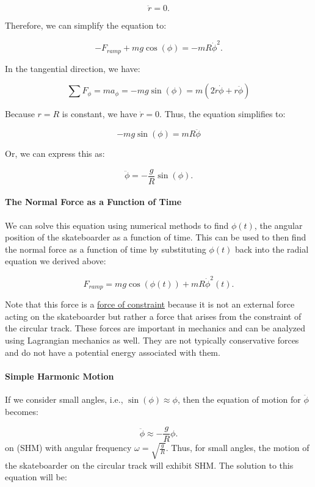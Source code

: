 \documentclass[11pt]{article}
\begin{document}
\[\ddot{r} = 0.\]

Therefore, we can simplify the equation to:

\[-F_{ramp} + mg \cos(\phi) = -mR \dot{\phi}^2.\]

In the tangential direction, we have:

\[\sum F_{\phi} = ma_{\phi} = -mg \sin(\phi) = m\left(2 \dot{r} \dot{\phi} + r \ddot{\phi}\right)\]

Because \(r=R\) is constant, we have \(\dot{r} = 0\). Thus, the equation
simplifies to:

\[-mg \sin(\phi) = mR \ddot{\phi}\]

Or, we can express this as:

\[\ddot{\phi} = -\frac{g}{R} \sin(\phi).\]

\paragraph{The Normal Force as a Function of
Time}\label{the-normal-force-as-a-function-of-time}

We can solve this equation using numerical methods to find \(\phi(t)\),
the angular position of the skateboarder as a function of time. This can
be used to then find the normal force as a function of time by
substituting \(\phi(t)\) back into the radial equation we derived above:

\[F_{ramp} = mg \cos(\phi(t)) + mR \dot{\phi}^2(t).\]

Note that this force is a
\href{https://en.wikipedia.org/wiki/Constraint_force}{force of
constraint} because it is not an external force acting on the
skateboarder but rather a force that arises from the constraint of the
circular track. These forces are important in mechanics and can be
analyzed using Lagrangian mechanics as well. They are not typically
conservative forces and do not have a potential energy associated with
them.

\paragraph{Simple Harmonic Motion}\label{simple-harmonic-motion}

If we consider small angles, i.e., \(\sin(\phi) \approx \phi\), then the
equation of motion for \(\ddot{\phi}\) becomes:

\[\ddot{\phi} \approx -\frac{g}{R} \phi.\] on (SHM) with angular
frequency \(\omega = \sqrt{\frac{g}{R}}\). Thus, for small angles, the
motion of the skateboarder on the circular track will exhibit SHM. The
solution to this equation will be:
\end{document}
